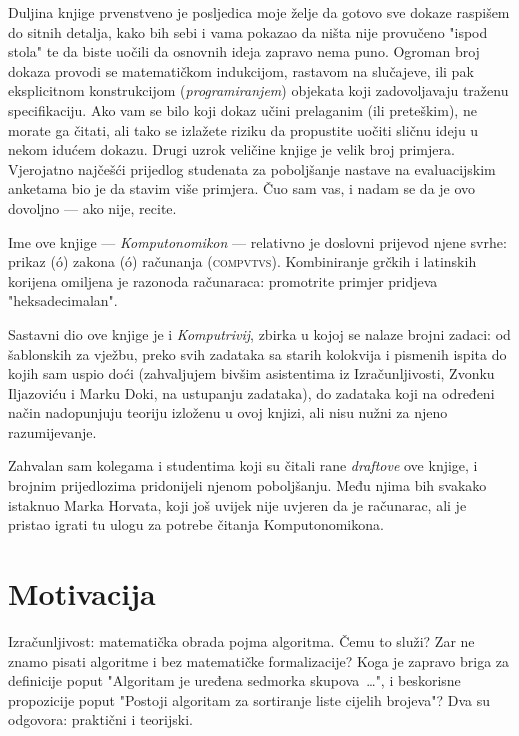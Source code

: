Duljina knjige prvenstveno je posljedica moje želje da gotovo sve dokaze raspišem do sitnih detalja, kako bih sebi i vama pokazao da ništa nije provučeno "ispod stola" te da biste uočili da osnovnih ideja zapravo nema puno. Ogroman broj dokaza provodi se matematičkom indukcijom, rastavom na slučajeve, ili pak eksplicitnom konstrukcijom (\emph{programiranjem}) objekata koji zadovoljavaju traženu specifikaciju. Ako vam se bilo koji dokaz učini prelaganim (ili preteškim), ne morate ga čitati, ali tako se izlažete riziku da propustite uočiti sličnu ideju u nekom idućem dokazu. Drugi uzrok veličine knjige je velik broj primjera. Vjerojatno najčešći prijedlog studenata za poboljšanje nastave na evaluacijskim anketama bio je da stavim više primjera. Čuo sam vas, i nadam se da je ovo dovoljno --- ako nije, recite.

Ime ove knjige --- \emph{Komputonomikon} --- relativno je doslovni prijevod njene svrhe: prikaz ({\textgreekfont\textepsilon\textiota\textkappa\'o\textnu\textalpha}) zakona ({\textgreekfont\textnu\'o\textmugreek\textomikron\textvarsigma}) računanja (\textsc{compvtvs}). Kombiniranje grčkih i latinskih korijena omiljena je razonoda računaraca: promotrite primjer pridjeva "heksadecimalan".

Sastavni dio ove knjige je i \emph{Komputrivij}, zbirka u kojoj se nalaze brojni zadaci: od šablonskih za vježbu, preko svih zadataka sa starih kolokvija i pismenih ispita do kojih sam uspio doći (zahvaljujem bivšim asistentima iz Izračunljivosti, Zvonku Iljazoviću i Marku Doki, na ustupanju zadataka), do zadataka koji na određeni način nadopunjuju teoriju izloženu u ovoj knjizi, ali nisu nužni za njeno razumijevanje.

Zahvalan sam kolegama i studentima koji su čitali rane \emph{draftove} ove knjige, i brojnim prijedlozima pridonijeli njenom poboljšanju. Među njima bih svakako istaknuo Marka Horvata, koji još uvijek nije uvjeren da je računarac, ali je pristao igrati tu ulogu za potrebe čitanja Komputonomikona.

\section[]{Motivacija}

Izračunljivost: matematička obrada pojma algoritma. Čemu to služi? Zar ne znamo pisati algoritme i bez matematičke formalizacije? Koga je zapravo briga za definicije poput "Algoritam je uređena sedmorka skupova~\ldots", i beskorisne propozicije poput "Postoji algoritam za sortiranje liste cijelih brojeva"? Dva su odgovora: praktični i teorijski.

